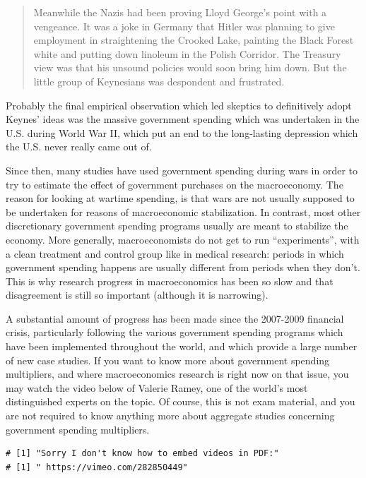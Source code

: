 \documentclass[]{book}
\begin{document}
\begin{quote}
Meanwhile the Nazis had been proving Lloyd George's point with a
vengeance. It was a joke in Germany that Hitler was planning to give
employment in straightening the Crooked Lake, painting the Black Forest
white and putting down linoleum in the Polish Corridor. The Treasury
view was that his unsound policies would soon bring him down. But the
little group of Keynesians was despondent and frustrated.
\end{quote}

Probably the final empirical observation which led skeptics to
definitively adopt Keynes' ideas was the massive government spending
which was undertaken in the U.S. during World War II, which put an end
to the long-lasting depression which the U.S. never really came out of.

Since then, many studies have used government spending during wars in
order to try to estimate the effect of government purchases on the
macroeconomy. The reason for looking at wartime spending, is that wars
are not usually supposed to be undertaken for reasons of macroeconomic
stabilization. In contrast, most other discretionary government spending
programs usually are meant to stabilize the economy. More generally,
macroeconomists do not get to run ``experiments'', with a clean
treatment and control group like in medical research: periods in which
government spending happens are usually different from periods when they
don't. This is why research progress in macroeconomics has been so slow
and that disagreement is still so important (although it is narrowing).

A substantial amount of progress has been made since the 2007-2009
financial crisis, particularly following the various government spending
programs which have been implemented throughout the world, and which
provide a large number of new case studies. If you want to know more
about government spending multipliers, and where macroeconomics research
is right now on that issue, you may watch the video below of Valerie
Ramey, one of the world's most distinguished experts on the topic. Of
course, this is not exam material, and you are not required to know
anything more about aggregate studies concerning government spending
multipliers.




\begin{verbatim}
# [1] "Sorry I don't know how to embed videos in PDF:"
# [1] " https://vimeo.com/282850449"
\end{verbatim}
\end{document}
